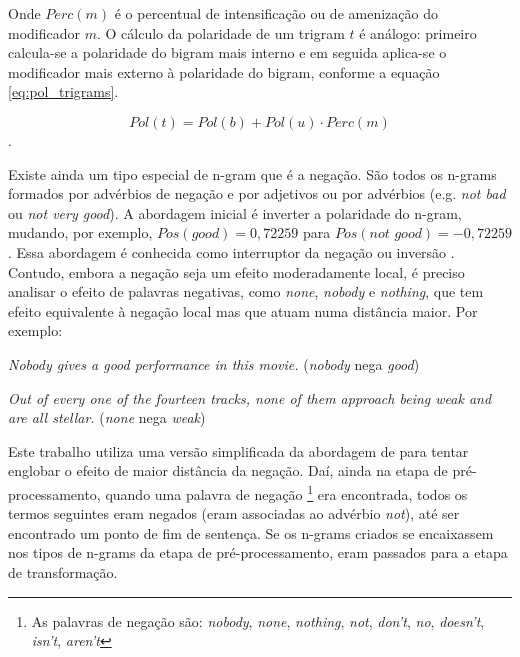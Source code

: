Onde $Perc(m)$ é o percentual de intensificação ou de amenização do modificador $m$. O cálculo da polaridade de um trigram $t$ é análogo: primeiro calcula-se a polaridade do bigram mais interno e em seguida aplica-se o modificador mais externo à polaridade do bigram, conforme a equação \ref{eq:pol_trigrams}.

\begin{equation} 
Pol(t) = Pol(b) + Pol(u) \cdot Perc(m)
\label{eq:pol_trigrams}
\end{equation}.

Existe ainda um tipo especial de n-gram que é a negação. São todos os n-grams formados por advérbios de negação e por adjetivos ou por advérbios (e.g. \textit{not bad} ou \textit{not very good}). A abordagem inicial é inverter a polaridade do n-gram, mudando, por exemplo, $Pos(\textit{good}) = 0,72259$ para $Pos(\textit{not good}) = - 0,72259$. Essa abordagem é conhecida como interruptor da negação ou inversão \cite{sauri2008factuality}. Contudo, embora a negação seja um efeito moderadamente local, é preciso analisar o efeito de palavras negativas, como \textit{none}, \textit{nobody} e \textit{nothing}, que tem efeito equivalente à negação local \cite{taboada2011lexicon} mas que atuam numa distância maior. Por exemplo:

\begin{example}
\textit{Nobody gives a good performance in this movie.} (\textit{nobody} nega \textit{good})
\label{ex:far_neg_1}
\end{example}

\begin{example}
\textit{Out of every one of the fourteen tracks, none of them approach being weak and are all stellar.} (\textit{none} nega \textit{weak})
\label{ex:far_neg_2}
\end{example}

Este trabalho utiliza uma versão simplificada da abordagem de \cite{das2001yahoo} para tentar englobar o efeito de maior distância da negação. Daí, ainda na etapa de pré-processamento, quando uma palavra de negação \footnote{As palavras de negação são: \textit{nobody}, \textit{none}, \textit{nothing}, \textit{not}, \textit{don't}, \textit{no}, \textit{doesn't}, \textit{isn't}, \textit{aren't}} era encontrada, todos os termos seguintes eram negados (eram associadas ao advérbio \textit{not}), até ser encontrado um ponto de fim de sentença. Se os n-grams criados se encaixassem nos tipos de n-grams da etapa de pré-processamento, eram passados para a etapa de transformação. 

